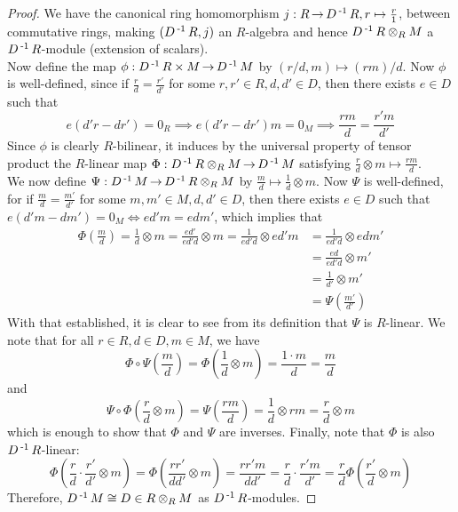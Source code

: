 \documentclass[11pt]{book}
\theoremstyle{definition}   \newtheorem{defn}[counter]{Definition} %
\DeclareMathOperator{\ra}{\rightarrow}   \DeclareMathOperator{\Poly}{\mathbf{P}}   \DeclareMathOperator{\spn}{\textnormal{span}}   \DeclareMathOperator{\aut}{\textnormal{Aut}}
\numberwithin{counter}{chapter}
\begin{document}
\begin{proof}
We have the canonical ring homomorphism $j : R \ra D\inv R, r \mapsto \frac{r}{1}$, between commutative rings, making $(D\operatorname{^{-1}} R, j)$ an $R$-algebra and hence $D\operatorname{^{-1}} R \otimes_R M$ a $D\operatorname{^{-1}} R$-module (extension of scalars). \\

Now define the map $\phi : D\inv R \times M \ra D\inv M$ by $(r/d,m) \mapsto (rm)/d$. Now $\phi$ is well-defined, since if $\frac{r}{d} = \frac{r'}{d'}$ for some $r,r' \in R, d,d' \in D$, then there exists $e \in D$ such that
	\[e(d'r-dr') = 0_R \implies e(d'r-dr')m = 0_M \implies \frac{rm}{d} = \frac{r'm}{d'} \]
Since $\phi$ is clearly $R$-bilinear, it induces by the universal property of tensor product the $R$-linear map $\Phi : D\inv R \otimes_R M \ra D\inv M$ satisfying $\frac{r}{d} \otimes m \mapsto \frac{rm}{d}$. \\

We now define $\Psi : D\inv M \ra D\inv R \otimes_R M$ by $\frac{m}{d} \mapsto \frac{1}{d} \otimes m$. Now $\Psi$ is well-defined, for if $\frac{m}{d} = \frac{m'}{d'}$ for some $m,m' \in M, d,d' \in D$, then there exists $e \in D$ such that $e(d'm - dm') = 0_M \iff ed'm = edm'$, which implies that
\begin{align*}
\Phi \left(\frac{m}{d}\right) = \frac{1}{d} \otimes m = \frac{ed'}{ed' d} \otimes m = \frac{1}{ed' d} \otimes ed'm &= \frac{1}{ed'd} \otimes edm' \\
&= \frac{ed}{ed'd} \otimes m' \\
&= \frac{1}{d'} \otimes m' \\
&= \Psi\left(\frac{m'}{d'}\right)
\end{align*}
With that established, it is clear to see from its definition that $\Psi$ is $R$-linear. We note that for all $r \in R, d \in D, m \in M$, we have
\[\Phi \circ \Psi \left(\frac{m}{d}\right) = \Phi \left(\frac{1}{d} \otimes m\right) = \frac{1 \cdot m}{d} = \frac{m}{d} \]
and
\[\Psi \circ \Phi \left(\frac{r}{d} \otimes m\right) = \Psi \left(\frac{rm}{d}\right) = \frac{1}{d} \otimes rm = \frac{r}{d} \otimes m \]
which is enough to show that $\Phi $ and $\Psi$ are inverses. Finally, note that $\Phi$ is also $D\operatorname{^{-1}} R$-linear:
\[\Phi \left(\frac{r}{d} \cdot \frac{r'}{d'} \otimes m\right) = \Phi \left(\frac{rr'}{dd'} \otimes m\right) = \frac{rr'm}{dd'} = \frac{r}{d} \cdot \frac{r'm}{d'} = \frac{r}{d} \Phi \left(\frac{r'}{d} \otimes m\right) \]
Therefore, $D\operatorname{^{-1}} M \cong D\in R \otimes_R M$ as $D\operatorname{^{-1}} R$-modules. 
\end{proof}
\end{document}
